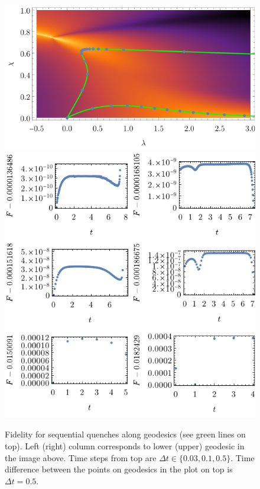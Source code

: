 
\begin{figure}[h]
    \centering
    \includegraphics[scale=1.2]{../img/bg123.pdf}
    \includegraphics[scale=1.2]{../img/plotsFidelityQuenches.pdf}
    \caption{Fidelity for sequential quenches along geodesics (see green lines on top). Left (right) column corresponds to lower (upper) geodesic in the image above. Time steps from top are $\Delta t\in \{0.03,0.1,0.5\}$. Time difference between the points on geodesics in the plot on top is $\Delta t=0.5$.}
    \label{fig:plotsFidelityQuenches}    
\end{figure}


